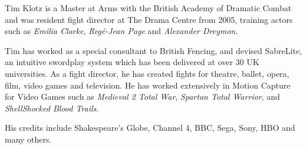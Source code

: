 Tim Klotz is a Master at Arms with the British Academy of Dramatic Combat and was resident fight director at The Drama Centre from 2005, training actors such as \emph{Emilia Clarke}, \emph{Reg\'e-Jean Page} and \emph{Alexander Dreymon}. 

Tim has worked as a special consultant to British Fencing, and devised SabreLite, an intuitive swordplay system which has been delivered at over 30 UK universities. As a fight director, he has created fights for theatre, ballet, opera, film, video games and television. He has worked extensively in Motion Capture for Video Games such as \emph{Medieval 2 Total War}, \emph{Spartan Total Warrior}, and \emph{ShellShocked Blood Trails}.

His credits include Shakespeare's Globe, Channel 4, BBC, Sega, Sony, HBO and many others.